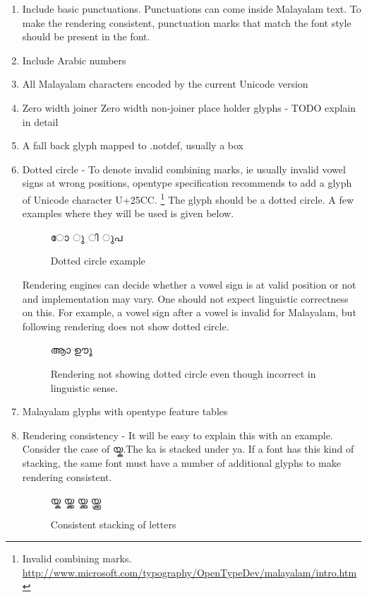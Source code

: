 \begin{enumerate}
\item Include basic punctuations. Punctuations can come inside Malayalam text.
To make the rendering consistent, punctuation marks that match the font style
should be present in the font.
\item Include Arabic numbers
\item All Malayalam characters encoded by the current Unicode version
\item Zero width joiner Zero width non-joiner place holder glyphs - TODO
explain in detail
\item A fall back glyph mapped to .notdef, usually a box
\item Dotted circle - To denote invalid combining marks, ie usually invalid
vowel signs at wrong positions, opentype specification
recommends to add a glyph of Unicode character U+25CC.
\footnote{Invalid combining marks.
\url{http://www.microsoft.com/typography/OpenTypeDev/malayalam/intro.htm}}
The glyph should be a
dotted circle. A few examples where they will be used is given below.
\begin{figure}[h]
  \centering
  {\meera\textexample ോ ു ി ുപ }\\
  \caption{Dotted circle example}
\end{figure}

Rendering engines can decide whether a vowel sign is at valid position or not
and implementation may vary.
One should not expect linguistic correctness on this. For example, a vowel sign
after a vowel is invalid for Malayalam, but following rendering does not show
dotted circle.

\begin{figure}[h]
  \centering
  {\meera\textexample ആാ ഊൂ }\\
  \caption{Rendering not showing dotted circle even though incorrect in
linguistic sense.}
\end{figure}

\item Malayalam glyphs with opentype feature tables
\item Rendering consistency - It will be easy to explain this with an example.
Consider the case of {\malayalam യ്ക}.The ka is stacked under ya. If a font has
this kind of stacking, the same font must have a number of additional glyphs to
make rendering consistent.
\begin{figure}[h!]
  \centering
  {\meera\textexample യ്ക യ്ക്ക യ്ക്കു യ്ക്കൂ }\\
  \caption{Consistent stacking of letters}
\end{figure}


\end{enumerate}
